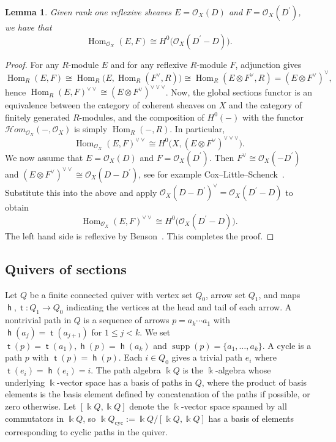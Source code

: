 \documentclass[11pt,a4paper]{amsart}
\numberwithin{equation}{section}
\newtheorem{lemma}[theorem]{Lemma}
\theoremstyle{definition}
\theoremstyle{remark}
\newcommand{\kk}{\ensuremath{\Bbbk}}
\newcommand{\head}{\operatorname{\mathsf{h}}}
\newcommand{\supp}{\operatorname{supp}}
\newcommand{\tail}{\operatorname{\mathsf{t}}}
\newcommand{\Hom}{\operatorname{Hom}}
\begin{document}
\begin{lemma}
\label{lem:reflexive}
Given rank one reflexive sheaves $E= \mathcal{O}_X(D)$ and $F=\mathcal{O}_X(D^\prime)$, we have that 
\begin{equation}
\label{eqn:reflexive}
\Hom_{\mathcal{O}_X}(E, F) \cong  H^0\big(\mathcal{O}_X(D^\prime-D)\big).
\end{equation}
\end{lemma}
\begin{proof}
For any $R$-module $E$ and for any reflexive $R$-module $F$, adjunction gives 
\[
\Hom_{R}(E,F)\cong \Hom_{R}\big(E,\Hom_{R}(F^\vee,R)\big) \cong 
\Hom_{R}(E\otimes F^\vee,R) = (E\otimes F^\vee)^\vee,
\]
hence $\Hom_{R}(E,F)^{\vee\vee}\cong (E\otimes F^\vee)^{\vee\vee\vee}$. Now, the global sections functor is an equivalence between the category of coherent sheaves on $X$ and the category of finitely generated $R$-modules, and the composition of $H^0(-)$ with the functor $\mathcal{H}om_{\mathscr{O}_X}(-,\mathscr{O}_X)$ is simply $\Hom_R(-,R)$. In particular, 
\[
\Hom_{\mathcal{O}_X}(E,F)^{\vee\vee} \cong  H^0\big(X,(E\otimes F^\vee)^{\vee\vee\vee}\big).
\]
We now assume that $E= \mathcal{O}_X(D)$ and $F=\mathcal{O}_X(D^\prime)$. Then $F^\vee \cong \mathcal{O}_X(-D^\prime)$ and $(E\otimes F^\vee)^{\vee\vee}\cong \mathcal{O}_X(D-D^\prime)$, see for example Cox--Little--Schenck~\cite[Proposition 8.0.6]{CLS}. Substitute this into the above and apply $\mathcal{O}_X(D-D^\prime)^\vee = \mathcal{O}_X(D^\prime-D)$ to obtain
\[
\Hom_{\mathcal{O}_X}(E, F)^{\vee\vee} \cong  H^0\big(\mathcal{O}_X(D^\prime-D)\big).
\]
The left hand side is reflexive by Benson~\cite[Lemma~3.4.1(iv)]{Benson}. This completes the proof.
\end{proof}

 \subsection{Quivers of sections}
 Let $Q$ be a finite connected quiver with vertex set $Q_0$, arrow set $Q_1$, and maps $\head, \tail \colon Q_1 \to Q_0$ indicating the vertices at the head and tail of each arrow.  A nontrivial path in $Q$ is a sequence of arrows $p = a_k \dotsb a_1$ with $\head(a_{j}) = \tail(a_{j+1})$ for $1 \leq j < k$.  We set $\tail(p) = \tail(a_{1}), \head(p) = \head(a_k)$ and $\supp(p)=\{a_1,\dots, a_k\}$.  A cycle is a path $p$ with $\tail(p) = \head(p)$. Each $i \in Q_0$ gives a trivial path $e_i$ where $\tail(e_i) = \head(e_i) = i$.  The path algebra $\kk Q$ is the $\kk$-algebra whose underlying $\kk$-vector space has a basis of paths in $Q$, where the product of basis elements is the basis element defined by concatenation of the paths if possible, or zero otherwise.  Let $[\kk Q,\kk Q]$ denote the $\kk$-vector space spanned by all commutators in $\kk Q$, so $\kk Q_{\text{cyc}}:=\kk Q/[\kk Q,\kk Q]$ has a basis of elements corresponding to cyclic paths in the quiver.
\end{document}
